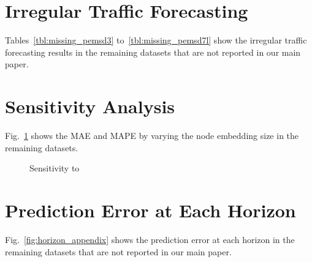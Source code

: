 \documentclass[letterpaper]{article} \usepackage{aaai22}  \usepackage{times}  \usepackage{helvet}  \usepackage{courier}  \usepackage[hyphens]{url}  \usepackage{graphicx} \urlstyle{rm} \def\UrlFont{\rm}  \usepackage{natbib}  \usepackage{caption} \DeclareCaptionStyle{ruled}{labelfont=normalfont,labelsep=colon,strut=off} \frenchspacing  \setlength{\pdfpagewidth}{8.5in}  \setlength{\pdfpageheight}{11in}  \usepackage{stfloats}
\begin{document}
\section{Irregular Traffic Forecasting}
Tables~\ref{tbl:missing_pemsd3} to~\ref{tbl:missing_pemsd7l} show the irregular traffic forecasting results in the remaining datasets that are not reported in our main paper.



\section{Sensitivity Analysis}
Fig.~\ref{fig:sensitivity_appendix} shows the MAE and MAPE by varying the node embedding size  in the remaining datasets.


\begin{figure}[t]
    \centering
    \caption{Sensitivity to }
    \label{fig:sensitivity_appendix}
\end{figure}

\section{Prediction Error at Each Horizon}
Fig.~\ref{fig:horizon_appendix} shows the prediction error at each horizon in the remaining datasets that are not reported in our main paper.
\end{document}
